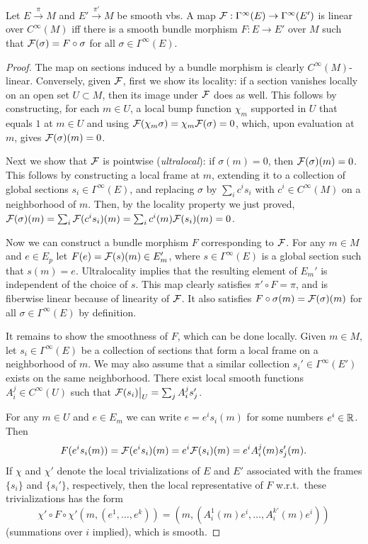 \begin{lem}
    Let $E\overset{\pi}{\to}M$ and $E'\overset{\pi'}{\to}M$ be smooth \glspl{vb}. A map $\mathcal{F}:\Gamma^\infty(E)\to \Gamma^\infty(E')$ is linear over $C^\infty(M)$ iff there is a smooth bundle morphism $F:E\to E'$ over $M$ such that $\mathcal{F}(\sigma)=F\circ\sigma$ for all $\sigma\in\Gamma^\infty(E)$.
\end{lem}
\begin{proof}
    The map on sections induced by a bundle morphism is clearly $C^\infty(M)$-linear. Conversely, given $\mathcal{F}$, first we show its locality: if a section vanishes locally on an open set $U\subset M$, then its image under $\mathcal{F}$ does as well. This follows by constructing, for each $m\in U$, a local bump function $\chi_m$ supported in $U$ that equals $1$ at $m\in U$ and using  $\mathcal{F}(\chi_m\sigma)=\chi_m\mathcal{F}(\sigma)=0$, which, upon evaluation at $m$, gives $\mathcal{F}(\sigma)(m)=0$.

    Next we show that $\mathcal{F}$ is pointwise (\emph{ultralocal}): if $\sigma(m)=0$, then $\mathcal{F}(\sigma)(m)=0$. This follows by constructing a local frame at $m$, extending it to a collection of global sections $s_i\in\Gamma^\infty(E)$, and replacing $\sigma$ by $\sum_i c^is_i$ with $c^i\in C^\infty(M)$ on a neighborhood of $m$. Then, by the locality property we just proved, $\mathcal{F}(\sigma)(m)=\sum_i\mathcal{F}(c^is_i)(m)=\sum_i c^i(m)\mathcal{F}(s_i)(m)=0$.

    Now we can construct a bundle morphism $F$ corresponding to $\mathcal{F}$. For any $m\in M$ and $e\in E_p$ let $F(e)=\mathcal{F}(s)(m)\in E'_m$, where $s\in \Gamma^\infty(E)$ is a global section such that $s(m)=e$. Ultralocality implies that the resulting element of $E_m'$ is independent of the choice of $s$. This map clearly satisfies $\pi'\circ F=\pi$, and is fiberwise linear because of linearity of $\mathcal{F}$. It also satisfies $F\circ\sigma(m)=\mathcal{F}(\sigma)(m)$ for all $\sigma\in\Gamma^\infty(E)$ by definition. 

    It remains to show the smoothness of $F$, which can be done locally. Given $m\in M$, let $s_i\in\Gamma^\infty(E)$ be a collection of sections that form a local frame on a neighborhood of $m$. We may also assume that a similar collection $s_i'\in\Gamma^\infty(E')$ exists on the same neighborhood. There exist local smooth functions $A_i^j\in C^\infty(U)$ such that $\restr{\calF(s_i)}{U}=\sum_j A_i^j s_j'$.

    For any $m\in U$ and $e\in E_m$ we can write $e=e^is_i(m)$ for some numbers $e^i\in\mathbb{R}$. Then 
    \[F(e^is_i(m))=\mathcal{F}(e^is_i)(m)=e^i\mathcal{F}(s_i)(m)=e^i A_i^j(m)s_j'(m).\]
    If $\chi$ and $\chi'$ denote the local trivializations of $E$ and $E'$ associated with the frames $\{s_i\}$ and $\{s_i'\}$, respectively, then the local representative of $F$ w.r.t.\ these trivializations has the form 
    \[\chi'\circ F\circ\chi'(m,(e^1,\ldots,e^k))=(m,(A_i^1(m)e^i,\ldots,A_i^{k'}(m)e^i))\]
    (summations over $i$ implied), which is smooth.
\end{proof}



